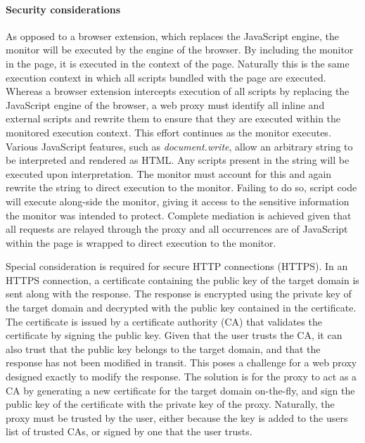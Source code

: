 \documentclass{llncs}
\newcommand{\todo}[1]{\colorbox{red}{\textcolor{white}{\sffamily\bfseries\scriptsize TODO}} \textcolor{red}{#1} \textcolor{red}{$\blacktriangleleft$}}
\begin{document}
\paragraph{Security considerations}

As opposed to a browser extension, which replaces the 
JavaScript engine, the monitor will be executed by the engine of the browser. 
By including the monitor in the page, it is executed in the context of the page. Naturally 
this is the same execution context in which all scripts bundled with the 
page are executed. Whereas a 
browser extension intercepts execution of all scripts by replacing the JavaScript 
engine of the browser, a web proxy must identify all inline and 
external scripts and rewrite them to ensure that they are executed within the 
monitored execution context. This effort continues as the monitor executes. 
Various JavaScript features, such as 
\emph{document.write}, allow an arbitrary string to be 
interpreted and rendered as HTML. Any scripts present in the string will be 
executed upon interpretation. The monitor must account for this and again rewrite 
the string to direct execution to the monitor. Failing to do so, script code will execute 
along-side the monitor, giving it access to the sensitive information the 
monitor was intended to protect. 
Complete mediation is achieved given that all requests are relayed through the proxy 
and all occurrences are of JavaScript within the page is wrapped to direct execution to the monitor.

Special consideration is required for secure HTTP connections (HTTPS). In an HTTPS 
connection, a certificate containing the public key of the target domain is sent 
along with the response. The response is encrypted using the private key of the target 
domain and decrypted with the public key contained in the certificate. The 
certificate is issued by a certificate authority (CA)
that validates the certificate by signing the public key. Given that the user 
trusts the CA, it can also trust that the public key belongs 
to the target domain, and that the response has not been modified in transit.
This poses a challenge for a web proxy designed exactly to modify the response. The solution 
is for the proxy to act as a CA by generating a
new certificate for the target domain on-the-fly, and sign the 
public key of the certificate with the private key of the proxy. Naturally, 
the proxy must be trusted by the user, either because the key is added to 
the users list of trusted CAs, or signed by one that the user trusts.
\end{document}
